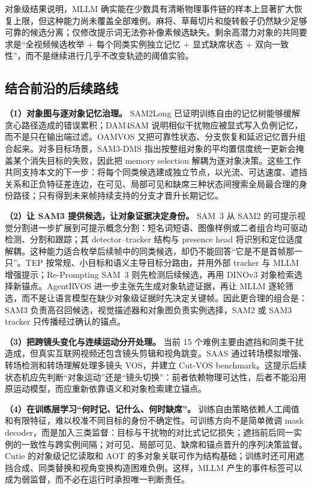 \documentclass[11pt,a4paper,oneside]{ctexart}
\begin{document}
对象级结果说明，MLLM 确实能在少数具有清晰物理事件链的样本上显著扩大恢复上限，但这种能力尚未覆盖全部难例。麻将、草莓切片和旋转骰子仍然缺少足够可靠的候选分离；仅修改提示词无法弥补像素候选缺失。剩余高潜力对象的共同要求是“全视频候选枚举 + 每个同类实例独立记忆 + 显式缺席状态 + 双向一致性”，而不是继续进行几乎不改变轨迹的阈值实验。

\subsection{结合前沿的后续路线}
\textbf{（1）对象图与逐对象记忆治理。} SAM2Long 已证明训练自由的记忆树能够缓解贪心路径造成的错误累积\cite{ding2024sam2long}；DAM4SAM 说明相似干扰物应被显式写入负例记忆，而不是只在输出端过滤\cite{videnovic2024dam4sam}。OAMVOS 又把可靠性状态、分支恢复和延迟记忆晋升组合起来\cite{oamvos2026}。对多目标场景，SAM3-DMS 指出按整组对象的平均置信度统一更新会掩盖某个消失目标的失败，因此把 memory selection 解耦为逐对象决策\cite{shen2026sam3dms}。这些工作共同支持本文的下一步：将每个同类候选建成独立节点，以光流、可达速度、遮挡关系和正负特征差连边，在可见、局部可见和缺席三种状态间搜索全局最合理的身份路径；只有得到未来帧持续支持的分支才晋升长期记忆。

\textbf{（2）让 SAM3 提供候选，让对象证据决定身份。} SAM~3 从 SAM2 的可提示视觉分割进一步扩展到可提示概念分割：短名词短语、图像样例或二者组合均可驱动检测、分割和跟踪；其 detector--tracker 结构与 presence head 将识别和定位适度解耦\cite{carion2025sam3}。这种能力适合枚举后续帧中的同类候选，却仍不能回答“它是不是首帧那一只”。TEP 按常规、小目标和语义主导目标分路由，并用外部 tracker 与 MLLM 增强提示\cite{zhang2026tep}；Re-Prompting SAM~3 则先检测后续候选，再用 DINOv3 对象检索选择新锚点\cite{gao2026reprompt}。AgentRVOS 进一步主张先生成对象轨迹证据，再让 MLLM 逐轮筛选，而不是让语言模型在缺少对象级证据时先决定关键帧\cite{agentrvos2026}。因此更合理的组合是：SAM3 负责高召回候选，视觉描述器和对象图负责实例选择，SAM2 或 SAM3 tracker 只传播经过确认的锚点。

\textbf{（3）把跨镜头变化与连续运动分开处理。} 当前 15 个难例主要由遮挡和同类干扰造成，但真实互联网视频还包含镜头剪辑和视角跳变。SAAS 通过转场模拟增强、转场检测和转场理解处理多镜头 VOS，并建立 Cut-VOS benchmark\cite{hu2026saas}。这提示后续状态机应先判断“对象运动”还是“镜头切换”：前者依赖物理可达性，后者不能沿用原运动模型，而应重新依靠语义和对象检索建立锚点。

\textbf{（4）在训练层学习“何时记、记什么、何时缺席”。} 训练自由策略依赖人工阈值和有限特征，难以校准不同目标的身份不确定性。可训练方向不是简单微调 mask decoder，而是加入三类监督：目标与干扰物的对比式记忆损失；遮挡前后同一实例的一致性与跨实例间隔；对可见、局部可见、缺席和锚点晋升的序列决策监督。Cutie 的对象级记忆读取\cite{cheng2024cutie}和 AOT 的多对象关联\cite{yang2021aot}可作为结构基础；训练时还可用遮挡合成、同类替换和视角变换构造困难负例。这样，MLLM 产生的事件标签可以成为弱监督，而不必在运行时承担唯一判断责任。
\end{document}
